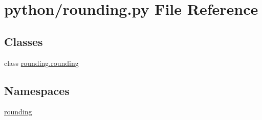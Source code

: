 \section{python/rounding.py File Reference}
\label{rounding_8py}
\subsection*{Classes}
\begin{DoxyCompactItemize}
\item 
class \hyperlink{classrounding_1_1rounding}{rounding.\-rounding}
\end{DoxyCompactItemize}
\subsection*{Namespaces}
\begin{DoxyCompactItemize}
\item 
\hyperlink{namespacerounding}{rounding}
\end{DoxyCompactItemize}
